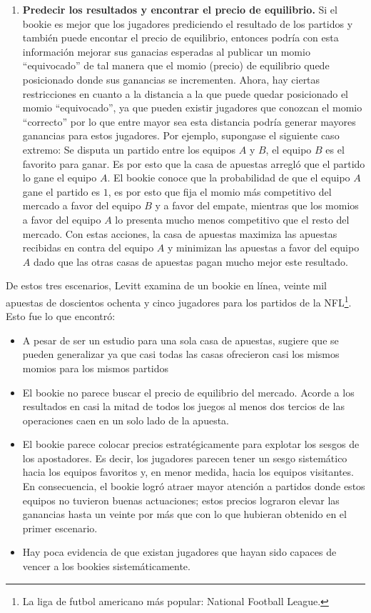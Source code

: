 \begin{enumerate}
	
	\item \textbf{Predecir los resultados y encontrar el precio de equilibrio.} Si el bookie es mejor que los jugadores prediciendo el resultado de los partidos y también puede encontar el precio de equilibrio, entonces podría con esta información mejorar sus ganacias esperadas al publicar un momio ``equivocado'' de tal manera que el momio (precio) de equilibrio quede posicionado donde sus ganancias se incrementen. Ahora, hay ciertas restricciones en cuanto a la distancia a la que puede quedar posicionado el momio ``equivocado'', ya que pueden existir jugadores que conozcan el momio ``correcto'' por lo que entre mayor sea esta distancia podría generar mayores ganancias para estos jugadores. Por ejemplo, supongase el siguiente caso extremo: Se disputa un partido entre los equipos $A$ y $B$, el equipo $B$ es el favorito para ganar. Es por esto que la casa de apuestas arregló que el partido lo gane el equipo $A$. El bookie conoce que la probabilidad de que el equipo $A$ gane el partido es $1$, es por esto que fija el momio más competitivo del mercado a favor del equipo $B$ y a favor del empate, mientras que los momios a favor del equipo $A$ lo presenta mucho menos competitivo que el resto del mercado. Con estas acciones, la casa de apuestas maximiza las apuestas recibidas en contra del equipo $A$ y minimizan las apuestas a favor del equipo $A$ dado que las otras casas de apuestas pagan mucho mejor este resultado.
\end{enumerate}



De estos tres escenarios, Levitt \cite{levitt2004gambling} examina de un bookie en línea, veinte mil apuestas de doscientos ochenta y cinco jugadores para los partidos de la NFL\footnote{La liga de futbol americano más popular: National Football League.}. Esto fue lo que encontró:
\begin{itemize}
	\item A pesar de ser un estudio para una sola casa de apuestas, sugiere que se pueden generalizar ya que casi todas las casas ofrecieron casi los mismos momios para los mismos partidos
	\item El bookie no parece buscar el precio de equilibrio del mercado. Acorde a los resultados en casi la mitad de todos los juegos al menos dos tercios de las operaciones caen en un solo lado de la apuesta.
	\item El bookie parece colocar precios estratégicamente para explotar los sesgos de los apostadores. Es decir, los jugadores parecen tener un sesgo sistemático hacia los equipos favoritos y, en menor medida, hacia los equipos visitantes. En consecuencia, el bookie logró atraer mayor atención a partidos donde estos equipos no tuvieron buenas actuaciones; estos precios lograron elevar las ganancias hasta un veinte por más que con lo que hubieran obtenido en el primer escenario.
	\item Hay poca evidencia de que existan jugadores que hayan sido capaces de vencer a los bookies sistemáticamente.
 \end{itemize}
 
